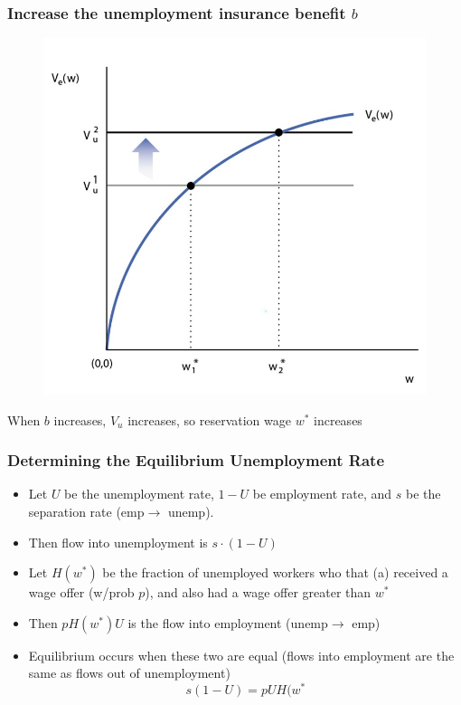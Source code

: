 \documentclass{beamer}
\begin{document}
\begin{frame}
\frametitle[alignment=center]{Increase the unemployment insurance benefit $b$}
\begin{figure}
\centering
\includegraphics[scale=0.5]{Figures/W_Fig_6pt11.png}
\end{figure}
When $b$ increases, $V_u$ increases, so reservation wage $w^*$ increases
\end{frame}


\begin{frame}
\frametitle[alignment=center]{Determining the Equilibrium Unemployment Rate}
\begin{itemize}
\item Let $U$ be the unemployment rate, $1-U$ be employment rate, and $s$ be the separation rate (emp$\rightarrow$ unemp). 
\bigskip
\item  Then flow into unemployment is $s\cdot (1-U)$
\bigskip
\item Let $H(w^*)$ be the fraction of unemployed workers who that (a) received a wage offer (w/prob $p$), and also had a wage offer greater than $w^*$ 
\bigskip
\item Then $pH(w^*)U$ is the flow into employment (unemp$\rightarrow$ emp)
\bigskip
\item Equilibrium occurs when these two are equal (flows into employment are the same as flows out of unemployment)
$$s(1-U)=pUH(w^*$$
\end{itemize}
\end{frame}
\end{document}
